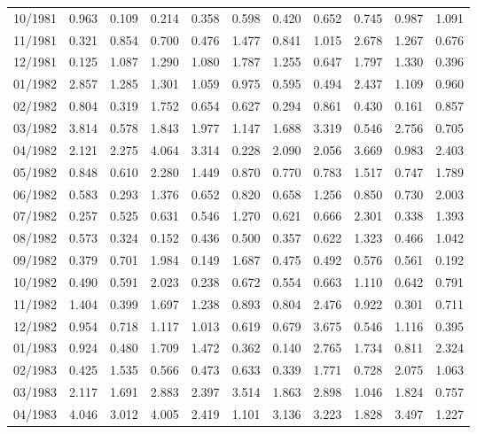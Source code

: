 \begin{tabular}{lrrrrrrrrrr}
10/1981 &  0.963 &  0.109 &  0.214 &  0.358 &  0.598 &  0.420 &  0.652 &  0.745 &  0.987 &  1.091 \\
11/1981 &  0.321 &  0.854 &  0.700 &  0.476 &  1.477 &  0.841 &  1.015 &  2.678 &  1.267 &  0.676 \\
12/1981 &  0.125 &  1.087 &  1.290 &  1.080 &  1.787 &  1.255 &  0.647 &  1.797 &  1.330 &  0.396 \\
01/1982 &  2.857 &  1.285 &  1.301 &  1.059 &  0.975 &  0.595 &  0.494 &  2.437 &  1.109 &  0.960 \\
02/1982 &  0.804 &  0.319 &  1.752 &  0.654 &  0.627 &  0.294 &  0.861 &  0.430 &  0.161 &  0.857 \\
03/1982 &  3.814 &  0.578 &  1.843 &  1.977 &  1.147 &  1.688 &  3.319 &  0.546 &  2.756 &  0.705 \\
04/1982 &  2.121 &  2.275 &  4.064 &  3.314 &  0.228 &  2.090 &  2.056 &  3.669 &  0.983 &  2.403 \\
05/1982 &  0.848 &  0.610 &  2.280 &  1.449 &  0.870 &  0.770 &  0.783 &  1.517 &  0.747 &  1.789 \\
06/1982 &  0.583 &  0.293 &  1.376 &  0.652 &  0.820 &  0.658 &  1.256 &  0.850 &  0.730 &  2.003 \\
07/1982 &  0.257 &  0.525 &  0.631 &  0.546 &  1.270 &  0.621 &  0.666 &  2.301 &  0.338 &  1.393 \\
08/1982 &  0.573 &  0.324 &  0.152 &  0.436 &  0.500 &  0.357 &  0.622 &  1.323 &  0.466 &  1.042 \\
09/1982 &  0.379 &  0.701 &  1.984 &  0.149 &  1.687 &  0.475 &  0.492 &  0.576 &  0.561 &  0.192 \\
10/1982 &  0.490 &  0.591 &  2.023 &  0.238 &  0.672 &  0.554 &  0.663 &  1.110 &  0.642 &  0.791 \\
11/1982 &  1.404 &  0.399 &  1.697 &  1.238 &  0.893 &  0.804 &  2.476 &  0.922 &  0.301 &  0.711 \\
12/1982 &  0.954 &  0.718 &  1.117 &  1.013 &  0.619 &  0.679 &  3.675 &  0.546 &  1.116 &  0.395 \\
01/1983 &  0.924 &  0.480 &  1.709 &  1.472 &  0.362 &  0.140 &  2.765 &  1.734 &  0.811 &  2.324 \\
02/1983 &  0.425 &  1.535 &  0.566 &  0.473 &  0.633 &  0.339 &  1.771 &  0.728 &  2.075 &  1.063 \\
03/1983 &  2.117 &  1.691 &  2.883 &  2.397 &  3.514 &  1.863 &  2.898 &  1.046 &  1.824 &  0.757 \\
04/1983 &  4.046 &  3.012 &  4.005 &  2.419 &  1.101 &  3.136 &  3.223 &  1.828 &  3.497 &  1.227 \\

\end{tabular}
